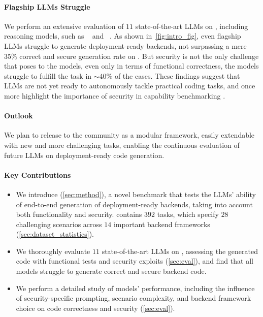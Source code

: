 \paragraph{Flagship LLMs Struggle}
We perform an extensive evaluation of $11$ state-of-the-art LLMs on \benchmark{}, including reasoning models, such as \openaiothree{}~\citep{o3minisystemcard} and \dsro{}~\citep{guo2025deepseek}.
As shown in~\cref{fig:intro_fig}, even flagship LLMs struggle to generate deployment-ready backends, not surpassing a mere $35\%$ correct and secure generation rate on \benchmark{}.
But security is not the only challenge that \benchmark{} poses to the models, even only in terms of functional correctness, the models struggle to fulfill the task in $\sim$$40\%$ of the cases.
These findings suggest that LLMs are not yet ready to autonomously tackle practical coding tasks, and once more highlight the importance of security in capability benchmarking \citep{pearce2022asleep,sven}.

\paragraph{Outlook}
We plan to release \benchmark{} to the community as a modular framework, easily extendable with new and more challenging tasks, enabling the continuous evaluation of future LLMs on deployment-ready code generation.

\paragraph{Key Contributions}
\begin{itemize}
    \item We introduce \benchmark{} (\cref{sec:method}), a novel benchmark that tests the LLMs' ability of end-to-end generation of deployment-ready backends, taking into account both functionality and security. \benchmark{} contains $392$ tasks, which specify $28$ challenging scenarios across $14$ important backend frameworks (\cref{sec:dataset_statistics}).
    \item We thoroughly evaluate $11$ state-of-the-art LLMs on \benchmark{}, assessing the generated code with functional tests and security exploits (\cref{sec:eval}), and find that all models struggle to generate correct and secure backend code.
    \item We perform a detailed study of models' performance, including the influence of security-specific prompting, scenario complexity, and backend framework choice on code correctness and security (\cref{sec:eval}).
\end{itemize}
 
